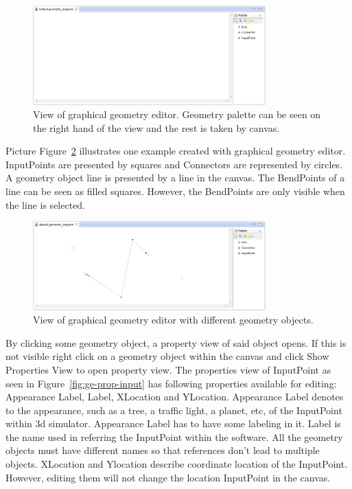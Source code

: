 \begin{figure}[htp]
\begin{center}
  \includegraphics[width=0.8\textwidth]{image/ge-diag-empty.png}
  \caption{View of graphical geometry editor. Geometry palette can be seen on the right hand of the view and the rest is taken by canvas.}
  \label{fig:ge-diag-empty}
\end{center}
\end{figure}

Picture Figure~\ref{fig:ge-diag-exam} illustrates one example created with graphical geometry editor. InputPoints are presented by squares and Connectors are represented by circles. A geometry object line is presented by a line in the canvas. The BendPoints of a line can be seen as filled squares. However, the BendPoints are only visible when the line is selected.

\begin{figure}[htp]
\begin{center}
  \includegraphics[width=0.8\textwidth]{image/ge-diag-exam.png}
  \caption{View of graphical geometry editor with different geometry objects.}
  \label{fig:ge-diag-exam}
\end{center}
\end{figure}

By clicking some geometry object, a property view of said object opens. If this is not visible right click on a geometry object within the canvas and click Show Properties View to open property view.
The properties view of InputPoint as seen in Figure~\ref{fig:ge-prop-input} has following properties available for editing: Appearance Label, Label, XLocation and YLocation. Appearance Label denotes to the appearance, such as a tree, a traffic light, a planet, etc, of the InputPoint within 3d simulator. Appearance Label has to have some labeling in it. Label is the name used in referring the InputPoint within the software. All the geometry objects must have different names so that references don't lead to multiple objects. XLocation and Ylocation describe coordinate location of the InputPoint. However, editing them will not change the location InputPoint in the canvas.

